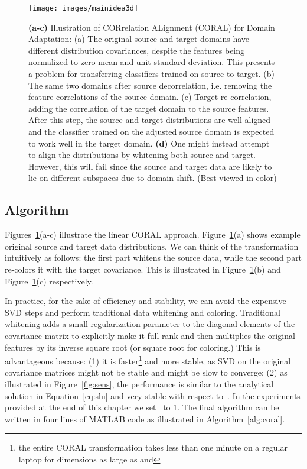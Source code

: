 \documentclass[graybox]{svmult}
\begin{document}
\begin{figure}[t]
\centering
\texttt{[image: images/mainidea3d]}
\caption{\small \textbf{(a-c)} Illustration of CORrelation ALignment (CORAL) for Domain Adaptation: (a) The original source and target domains have different distribution covariances, despite the features being normalized to zero mean and unit standard deviation. This presents a problem for transferring classifiers trained on source to target. (b) The same two domains after source decorrelation, i.e. removing the feature correlations of the source domain. (c) Target re-correlation, adding the correlation of the target domain to the source features. After this step, the source and target distributions are well aligned and the classifier trained on the adjusted source domain is expected to work well in the target domain. \textbf{(d)} One might instead attempt to align the distributions by whitening both source and target. However, this will fail since the source and target data are likely to lie on different subspaces due to domain shift. (Best viewed in color)}
\label{fig:variance}
\end{figure}

\subsection{Algorithm}
\label{subsec:algo}
Figures~\ref{fig:variance}(a-c) illustrate the linear CORAL approach. Figure~\ref{fig:variance}(a) shows example original source and target data distributions. We can think of the transformation  intuitively as follows: the first part  whitens the source data, while the second part  re-colors it with the target covariance. This is illustrated in Figure~\ref{fig:variance}(b) and Figure~\ref{fig:variance}(c) respectively.

In practice, for the sake of efficiency and stability, we can avoid the expensive SVD steps and perform traditional data whitening and coloring.
Traditional whitening adds a small regularization parameter  to the diagonal elements of the covariance matrix to explicitly make it full rank and then multiplies the original features by its inverse square root (or square root for coloring.) 
This is advantageous because: (1) 
it is faster\footnote{the entire CORAL transformation takes less than one minute on a regular laptop for dimensions as large as  and } and more stable, as SVD on the original covariance matrices might not be stable and might be slow to converge; (2) as illustrated in Figure~\ref{fig:sens}, the performance is similar to the analytical solution in Equation~\eqref{eq:slu} and very stable with respect to~. In the experiments provided at the end of this chapter we set~ to 1. The final algorithm can be written in four lines of MATLAB code as illustrated in Algorithm~\ref{alg:coral}.
 
\end{document}
